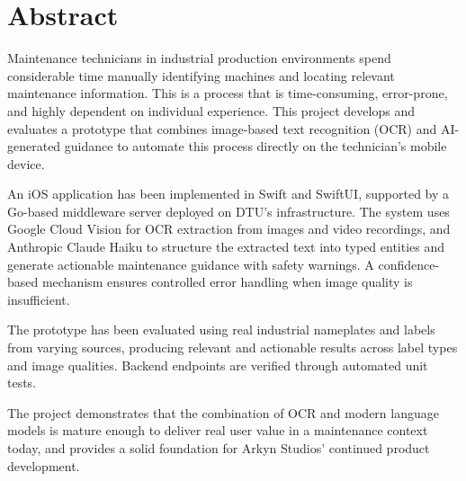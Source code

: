 \documentclass[12pt, a4paper, oneside]{report}
\begin{document}

\chapter*{Abstract}
\thispagestyle{plain}

%

Maintenance technicians in industrial production environments spend considerable time manually identifying machines and locating relevant maintenance information. This is a process that is time-consuming, error-prone, and highly dependent on individual experience. This project develops and evaluates a prototype that combines image-based text recognition (OCR) and AI-generated guidance to automate this process directly on the technician's mobile device.

An iOS application has been implemented in Swift and SwiftUI, supported by a Go-based middleware server deployed on DTU's infrastructure. The system uses Google Cloud Vision for OCR extraction from images and video recordings, and Anthropic Claude Haiku to structure the extracted text into typed entities and generate actionable maintenance guidance with safety warnings. A confidence-based mechanism ensures controlled error handling when image quality is insufficient.

The prototype has been evaluated using real industrial nameplates and labels from varying sources, producing relevant and actionable results across label types and image qualities. Backend endpoints are verified through automated unit tests.

The project demonstrates that the combination of OCR and modern language models is mature enough to deliver real user value in a maintenance context today, and provides a solid foundation for Arkyn Studios' continued product development.
\end{document}
